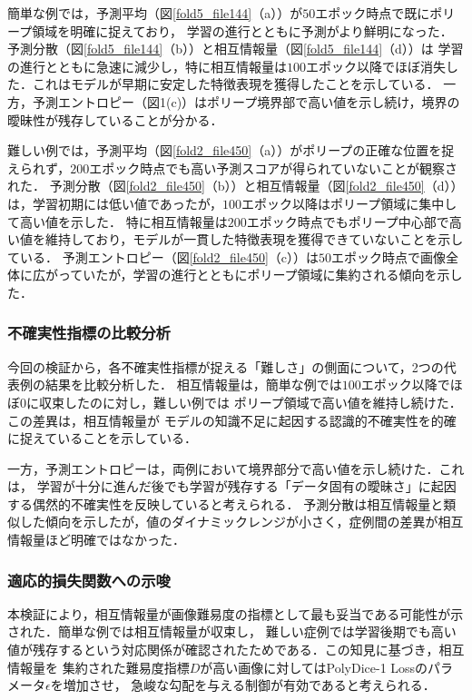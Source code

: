 \documentclass[10pt, a4paper, twocolumn]{jarticle}
\begin{document}
簡単な例では，予測平均（図\ref{fold5_file144}（a））が$50$エポック時点で既にポリープ領域を明確に捉えており，
学習の進行とともに予測がより鮮明になった．予測分散（図\ref{fold5_file144}（b））と相互情報量（図\ref{fold5_file144}（d））は
学習の進行とともに急速に減少し，特に相互情報量は$100$エポック以降でほぼ消失した．これはモデルが早期に安定した特徴表現を獲得したことを示している．
一方，予測エントロピー（図1(c)）はポリープ境界部で高い値を示し続け，境界の曖昧性が残存していることが分かる．

難しい例では，予測平均（図\ref{fold2_file450}（a））がポリープの正確な位置を捉えられず，$200$エポック時点でも高い予測スコアが得られていないことが観察された．
予測分散（図\ref{fold2_file450}（b））と相互情報量（図\ref{fold2_file450}（d））は，学習初期には低い値であったが，$100$エポック以降はポリープ領域に集中して高い値を示した．
特に相互情報量は$200$エポック時点でもポリープ中心部で高い値を維持しており，モデルが一貫した特徴表現を獲得できていないことを示している．
予測エントロピー（図\ref{fold2_file450}（c））は$50$エポック時点で画像全体に広がっていたが，学習の進行とともにポリープ領域に集約される傾向を示した．

\subsubsection{不確実性指標の比較分析}

今回の検証から，各不確実性指標が捉える「難しさ」の側面について，2つの代表例の結果を比較分析した．
相互情報量は，簡単な例では$100$エポック以降でほぼ$0$に収束したのに対し，難しい例では
ポリープ領域で高い値を維持し続けた．この差異は，相互情報量が
モデルの知識不足に起因する認識的不確実性を的確に捉えていることを示している．

一方，予測エントロピーは，両例において境界部分で高い値を示し続けた．これは，
学習が十分に進んだ後でも学習が残存する「データ固有の曖昧さ」に起因する偶然的不確実性を反映していると考えられる．
予測分散は相互情報量と類似した傾向を示したが，値のダイナミックレンジが小さく，症例間の差異が相互情報量ほど明確ではなかった．

\subsubsection{適応的損失関数への示唆}
本検証により，相互情報量が画像難易度の指標として最も妥当である可能性が示された．簡単な例では相互情報量が収束し，
難しい症例では学習後期でも高い値が残存するという対応関係が確認されたためである．この知見に基づき，相互情報量を
集約された難易度指標$D$が高い画像に対してはPolyDice-1 Lossのパラメータ$\epsilon$を増加させ，
急峻な勾配を与える制御が有効であると考えられる．
\end{document}

